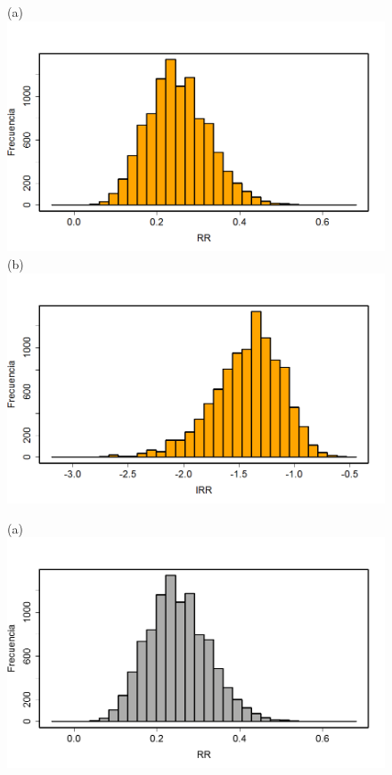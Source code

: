 \begin{ejemplo}
\begin{figure}[p]
\begin{center}
\begin{enColor}
(a)\\[3mm]
\includegraphics[width=13cm]{../fig/Cap09-EjemploLogRR05.png}\\[3mm]
(b)\\[3mm]
\includegraphics[width=13cm]{../fig/Cap09-EjemploLogRR06.png}
\end{enColor}
\begin{bn}
(a)\\[3mm]
\includegraphics[width=13cm]{../fig/Cap09-EjemploLogRR05-bn.png}\\[3mm]

\end{bn}
\end{center}
\end{figure}
\end{ejemplo}
